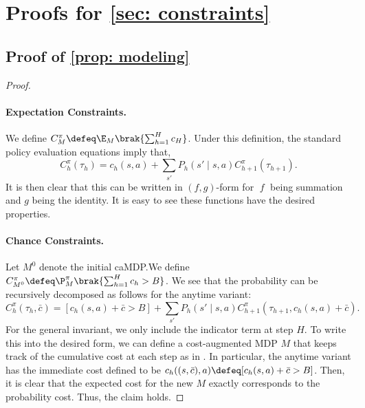 \documentclass[pdftex, a4paper, 12pt]{article}
\DeclareMathOperator*{\f}{\mathit{f}}
\begin{document}



\appendix

\section{Proofs for \texorpdfstring{\cref{sec: constraints}}{sec: constraints}}

\subsection{Proof of \texorpdfstring{\cref{prop: modeling}}{prop: modeling}}

\begin{proof}\

    \paragraph{Expectation Constraints.} We define $C_M^{\pi} \defeq \E_M\brak{\sum_{h = 1}^H c_H}$. Under this definition, the standard policy evaluation equations imply that,
    \begin{equation}
        C^{\pi}_h(\tau_h) = c_h(s,a) + \sum_{s'} P_h(s' \mid s,a) C_{h+1}^{\pi}(\tau_{h+1}).
    \end{equation}
    It is then clear that this can be written in $(f,g)$-form for $\f$ being summation and $g$ being the identity. It is easy to see these functions have the desired properties.

    \paragraph{Chance Constraints.} Let $M^0$ denote the initial caMDP.We define $C_{M^0}^{\pi} \defeq 
    \P^{\pi}_M\brak{\sum_{h = 1}^H c_h > B}$. We see that the probability can be recursively decomposed as follows for the anytime variant:
    \begin{equation}
        C^{\pi}_h(\tau_h, \bar{c}) = [c_h(s,a) + \bar{c} > B] + \sum_{s'} P_h(s' \mid s,a) C_{h+1}^{\pi}(\tau_{h+1}, c_h(s,a) + \bar{c}).
    \end{equation}
    For the general invariant, we only include the indicator term at step $H$. To write this into the desired form, we can define a cost-augmented MDP $M$ that keeps track of the cumulative cost at each step as in \cite{acMARL}. In particular, the anytime variant has the immediate cost defined to be $c_h((s,\bar{c}),a) \defeq [c_h(s,a) + \bar{c} > B]$. Then, it is clear that the expected cost for the new $M$ exactly corresponds to the probability cost. Thus, the claim holds.


\end{proof}
\end{document}
